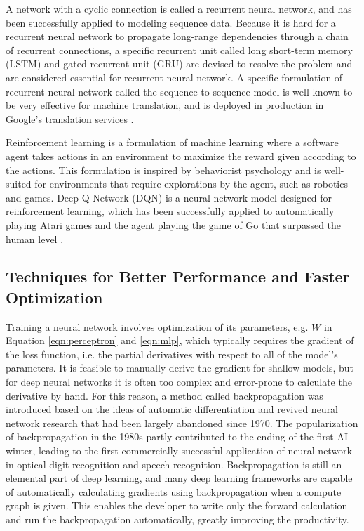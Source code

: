 A network with a cyclic connection is called a recurrent neural network, and has been successfully applied to modeling sequence data.
Because it is hard for a recurrent neural network to propagate long-range dependencies through a chain of recurrent connections, a specific recurrent unit called long short-term memory (LSTM) \cite{hochreiter1997lstm} and gated recurrent unit (GRU) \cite{cho2014seq2seq} are devised to resolve the problem and are considered essential for recurrent neural network.
A specific formulation of recurrent neural network called the sequence-to-sequence model \cite{cho2014seq2seq,sutskever2014seq2seq} is well known to be very effective for machine translation, and is deployed in production in Google's translation services \cite{wu2016google}.

Reinforcement learning \cite{sutton1998reinforcement} is a formulation of machine learning where a software agent takes actions in an environment to maximize the reward given according to the actions.
This formulation is inspired by behaviorist psychology and is well-suited for environments that require explorations by the agent, such as robotics and games.
Deep Q-Network (DQN) \cite{mnih2015dqn} is a neural network model designed for reinforcement learning, which has been successfully applied to automatically playing Atari games \cite{mnih2013atari} and the agent playing the game of Go that surpassed the human level \cite{silver2016alphago}.

\subsection{Techniques for Better Performance and Faster Optimization}

Training a neural network involves optimization of its parameters, e.g. $W$ in Equation \ref{eqn:perceptron} and \ref{eqn:mlp}, which typically requires the gradient of the loss function, i.e. the partial derivatives with respect to all of the model's parameters.
It is feasible to manually derive the gradient for shallow models, but for deep neural networks it is often too complex and error-prone to calculate the derivative by hand.
For this reason, a method called backpropagation \cite{werbos1982backpropagation, williams1986backpropagation} was introduced based on the ideas of automatic differentiation \cite{linnainmaa1970ad} and revived neural network research that had been largely abandoned since 1970.
The popularization of backpropagation in the 1980s partly contributed to the ending of the first AI winter, leading to the first commercially successful application of neural network in optical digit recognition and speech recognition.
Backpropagation is still an elemental part of deep learning, and many deep learning frameworks are capable of automatically calculating gradients using backpropagation when a compute graph is given.
This enables the developer to write only the forward calculation and run the backpropagation automatically, greatly improving the productivity.

